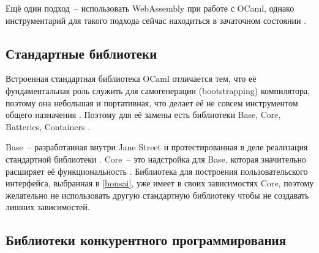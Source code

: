Ещё один подход~-- использовать WebAssembly при работе с OCaml, однако
инструментарий для такого подхода сейчас находиться в зачаточном состоянии \TODO.

\subsection{Стандартные библиотеки}

Встроенная стандартная библиотека OCaml отличается тем, что её фундаментальная роль
служить для самогенерации (bootstrapping) компилятора, поэтому она небольшая и портативная,
что делает её не совсем инструментом общего назначения \cite{rwo-prologue}.
Поэтому для её замены есть библиотеки Base, Core, Batteries, Containers \cite{ocamlverse-libraries}.

Base~-- разработанная внутри Jane Street и протестированная в деле реализация стандартной библиотеки \cite{ocamlverse-libraries}.
Core~-- это надстройка для Base, которая значительно расширяет её функциональность \cite{janestreet-opensource}.
Библиотека для построения пользовательского интерфейса, выбранная в \ref{bonsai}, уже имеет в своих зависимостях Core,
поэтому желательно не использовать другую стандартную библиотеку чтобы не создавать лишних зависимостей.

\subsection{Библиотеки конкурентного программирования}

